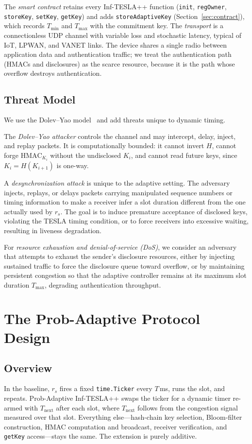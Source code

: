 \documentclass[conference]{IEEEtran}
\begin{document}
The \emph{smart contract} retains every Inf-TESLA++ function (\texttt{init},
\texttt{regOwner}, \texttt{storeKey}, \texttt{setKey}, \texttt{getKey}) and adds
\texttt{storeAdaptiveKey} (Section~\ref{sec:contract}), which records $T_{\min}$
and $T_{\max}$ with the commitment key. The \emph{transport} is a connectionless
UDP channel with variable loss and stochastic latency, typical of IoT, LPWAN, and
VANET links. The device shares a single radio between application data and
authentication traffic; we treat the authentication path (HMACs and disclosures)
as the scarce resource, because it is the path whose overflow destroys
authentication.

\subsection{Threat Model}
We use the Dolev--Yao model~\cite{dolev} and add threats unique to dynamic timing.

The \emph{Dolev--Yao attacker} controls the channel and may intercept, delay,
inject, and replay packets. It is computationally bounded: it cannot invert $H$,
cannot forge $\mathrm{HMAC}_{K_i}$ without the undisclosed $K_i$, and cannot read
future keys, since $K_i = H(K_{i+1})$ is one-way.

A \emph{desynchronization attack} is unique to the adaptive setting. The
adversary injects, replays, or delays packets carrying manipulated sequence
numbers or timing information to make a receiver infer a slot duration different
from the one actually used by $r_s$. The goal is to induce premature acceptance
of disclosed keys, violating the TESLA timing condition, or to force receivers
into excessive waiting, resulting in liveness degradation.

For \emph{resource exhaustion and denial-of-service (DoS)}, we consider an
adversary that attempts to exhaust the sender's disclosure resources, either by
injecting sustained traffic to force the disclosure queue toward overflow, or by
maintaining persistent congestion so that the adaptive controller remains at its
maximum slot duration $T_{\max}$, degrading authentication throughput.

\section{The Prob-Adaptive Protocol Design}

\subsection{Overview}
In the baseline, $r_s$ fires a fixed \texttt{time.Ticker} every $T$\,ms, runs the
slot, and repeats. Prob-Adaptive Inf-TESLA++ swaps the ticker for a dynamic timer
re-armed with $T_{\mathrm{next}}$ after each slot, where $T_{\mathrm{next}}$
follows from the congestion signal measured over that slot. Everything
else---hash-chain key selection, Bloom-filter construction, HMAC computation and
broadcast, receiver verification, and \texttt{getKey} access---stays the same.
The extension is purely additive.
\end{document}
